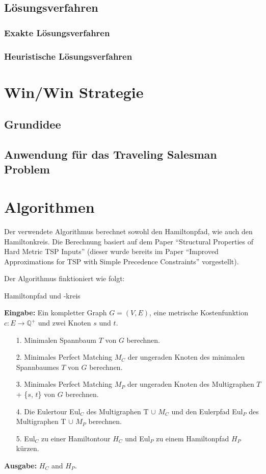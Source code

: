 \documentclass[a4paper]{article}
\begin{document}
\subsection{Lösungsverfahren}
\subsubsection{Exakte Lösungsverfahren}
\subsubsection{Heuristische Lösungsverfahren}
\newpage
\section{Win/Win Strategie}
\subsection{Grundidee}
\subsection{Anwendung für das Traveling Salesman Problem}
\newpage
\section{Algorithmen}
Der verwendete Algorithmus berechnet sowohl den Hamiltonpfad, wie auch den Hamiltonkreis. Die Berechnung basiert auf dem Paper "`Structural Properties of Hard Metric TSP Inputs"'\cite{moemke11} (dieser wurde bereits im Paper "`Improved Approximations for TSP with Simple Precedence Constraints"'\cite{boeckenhauer10} vorgestellt).

Der Algorithmus finktioniert wie folgt:
\begin{algorithm}
    \caption{Hamiltonpfad und -kreis \cite{moemke11}}
\textbf{Eingabe:} Ein kompletter Graph $G = (V,E)$, eine metrische Kostenfunktion $c: E \rightarrow \mathbb{Q}^+$ und zwei Knoten $s$ und $t$.
    \begin{itemize}
        \item[1.] Minimalen Spannbaum $T$ von $G$ berechnen.
        \item[2.] Minimales Perfect Matching $M_C$ der ungeraden Knoten des minimalen Spannbaumes $T$ von $G$ berechnen.
        \item[3.] Minimales Perfect Matching $M_P$ der ungeraden Knoten des Multigraphen $T$ + \{$s$, $t$\} von $G$ berechnen.
        \item[4.] Die Eulertour Eul$_C$ des Multigraphen T $\cup$ $M_C$ und den Eulerpfad Eul$_P$ des Multigraphen T $\cup$ $M_P$ berechnen.
        \item[5.] Eul$_C$ zu einer Hamiltontour $H_C$ und Eul$_P$ zu einem Hamiltonpfad $H_P$ kürzen.
    \end{itemize}
\textbf{Ausgabe:} $H_C$ and $H_P$.

\end{algorithm}
\end{document}
